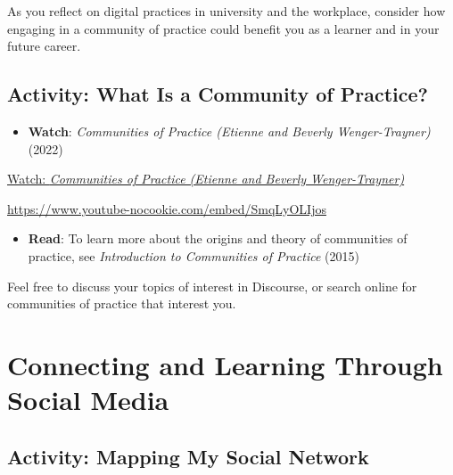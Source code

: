 \documentclass[
  letterpaper,
  DIV=11,
  numbers=noendperiod]{scrreprt}
\providecommand{\tightlist}{%
  \setlength{\itemsep}{0pt}\setlength{\parskip}{0pt}}\usepackage{longtable,booktabs,array}
\begin{document}
As you reflect on digital practices in university and the workplace,
consider how engaging in a community of practice could benefit you as a
learner and in your future career.

\subsection{Activity: What Is a Community of
Practice?}\label{activity-what-is-a-community-of-practice}

\begin{tcolorbox}[enhanced jigsaw, toprule=.15mm, colback=white, colframe=quarto-callout-note-color-frame, bottomtitle=1mm, leftrule=.75mm, coltitle=black, titlerule=0mm, rightrule=.15mm, colbacktitle=quarto-callout-note-color!10!white, left=2mm, title={Learning Activity}, opacitybacktitle=0.6, opacityback=0, breakable, toptitle=1mm, arc=.35mm, bottomrule=.15mm]

\begin{itemize}
\tightlist
\item
  \textbf{Watch}: \emph{Communities of Practice (Etienne and Beverly
  Wenger-Trayner)} (2022)
\end{itemize}

\href{https://www.youtube.com/watch?v=SmqLyOLIjos}{Watch:
\emph{Communities of Practice (Etienne and Beverly Wenger-Trayner)}}

\url{https://www.youtube-nocookie.com/embed/SmqLyOLIjos}

\begin{itemize}
\tightlist
\item
  \textbf{Read}: To learn more about the origins and theory of
  communities of practice, see \emph{Introduction to Communities of
  Practice} (2015)
\end{itemize}

Feel free to discuss your topics of interest in Discourse, or search
online for communities of practice that interest you.

\end{tcolorbox}

\section{Connecting and Learning Through Social
Media}\label{connecting-and-learning-through-social-media}

\subsection{Activity: Mapping My Social
Network}\label{activity-mapping-my-social-network}
\end{document}
